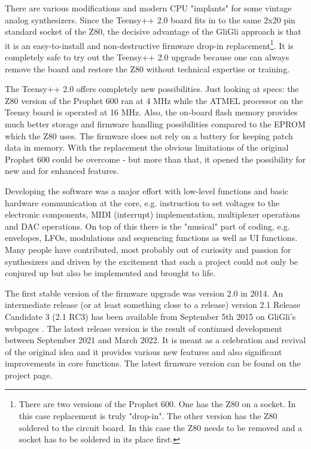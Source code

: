 \documentclass[landscape, 11pt, oneside]{report}
\newenvironment{flowtext}{\addmargin[0cm]{7cm}}{\endaddmargin} %
\begin{document}
\begin{flowtext}
There are various modifications and modern CPU "implants" for some vintage analog synthesizers. Since the Teensy++ 2.0 board fits in to the same 2x20 pin standard socket of the Z80, the decisive advantage of the GliGli approach is that it is an easy-to-install and non-destructive firmware drop-in replacement\footnote{There are two versions of the Prophet 600. One has the Z80 on a socket. In this case replacement is truly "drop-in". The other version has the Z80 soldered to the circuit board. In this case the Z80 needs to be removed and a socket has to be soldered in its place first.}. It is completely safe to try out the Teensy++ 2.0 upgrade because one can always remove the board and restore the Z80 without technical expertise or training. 

The Teensy++ 2.0 offers completely new possibilities. Just looking at specs: the Z80 version of the Prophet 600 ran at 4 MHz while the ATMEL processor on the Teensy board is operated at 16 MHz. Also, the on-board flash memory provides much better storage and firmware handling possibilities compared to the EPROM which the Z80 uses. The firmware does not rely on a battery for keeping patch data in memory. With the replacement the obvious limitations of the original Prophet 600 could be overcome - but more than that, it opened the possibility for new and for enhanced features. 

Developing the software was a major effort with low-level functions and basic hardware communication at the core, e.g. instruction to set voltages to the electronic components, MIDI (interrupt) implementation, multiplexer operations and DAC operations. On top of this there is the "musical" part of coding, e.g. envelopes, LFOs, modulations and sequencing functions as well as UI functions. Many people have contributed, most probably out of curiosity and passion for synthesizers and driven by the excitement that such a project could not only be conjured up but also be implemented and brought to life. 

The first stable version of the firmware upgrade was version 2.0 in 2014. An intermediate release (or at least something close to a release) version 2.1 Release Candidate 3 (2.1 RC3) has been available from September 5th 2015 on GliGli's webpages \cite{gligli}. The latest release version \version is the result of continued development between September 2021 and March 2022. It is meant as a celebration and revival of the original idea and it provides various new features and also significant improvements in core functions. The latest firmware version can be found on the project page\cite{newversion}.


\end{flowtext}
\end{document}
